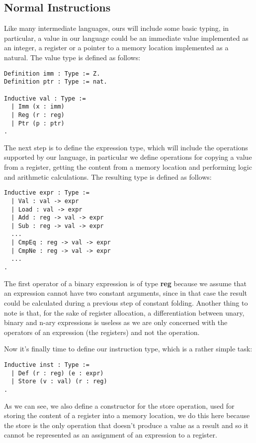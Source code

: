 \subsection{Normal Instructions}

Like many intermediate languages, ours will include some basic typing, in particular, a value in our language could be an immediate value implemented as an integer, a register or a pointer to a memory location implemented as a natural. The value type is defined as follows:

\begin{lstlisting}[language=Coq]
Definition imm : Type := Z.
Definition ptr : Type := nat.

Inductive val : Type :=
  | Imm (x : imm)
  | Reg (r : reg)
  | Ptr (p : ptr)
.
\end{lstlisting}

The next step is to define the expression type, which will include the operations supported by our language, in particular we define operations for copying a value from a register, getting the content from a memory location and performing logic and arithmetic calculations. The resulting type is defined as follows:

\begin{lstlisting}[language=Coq]
Inductive expr : Type :=
  | Val : val -> expr
  | Load : val -> expr
  | Add : reg -> val -> expr
  | Sub : reg -> val -> expr
  ...
  | CmpEq : reg -> val -> expr
  | CmpNe : reg -> val -> expr
  ...
.
\end{lstlisting}

The first operator of a binary expression is of type \textbf{reg} because we assume that an expression cannot have two constant arguments, since in that case the result could be calculated during a previous step of constant folding.
Another thing to note is that, for the sake of register allocation, a differentiation between unary, binary and n-ary expressions is useless as we are only concerned with the operators of an expression (the registers) and not the operation.

Now it's finally time to define our instruction type, which is a rather simple task:

\begin{lstlisting}[language=Coq]
  Inductive inst : Type :=
  | Def (r : reg) (e : expr)
  | Store (v : val) (r : reg)
.
\end{lstlisting}

As we can see, we also define a constructor for the store operation, used for storing the content of a register into a memory location, we do this here because the store is the only operation that doesn't produce a value as a result and so it cannot be represented as an assignment of an expression to a register.

